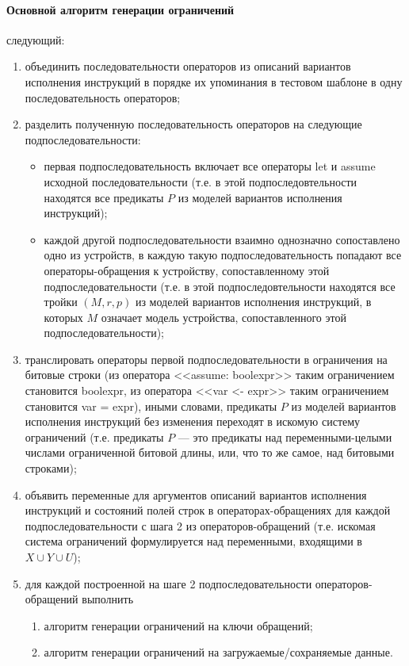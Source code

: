 \paragraph{Основной алгоритм генерации ограничений} следующий:
\begin{enumerate}
    \item объединить последовательности операторов из описаний вариантов исполнения инструкций в порядке их упоминания в тестовом шаблоне в одну последовательность операторов;
    \item разделить полученную последовательность операторов на следующие подпоследовательности:
            \begin{itemize}
                \item первая подпоследовательность включает все операторы let и assume исходной последовательности (т.е. в этой подпоследовтельности находятся все предикаты $P$ из моделей вариантов исполнения инструкций);
                \item каждой другой подпоследовательности взаимно однозначно сопоставлено одно из устройств, в каждую такую подпоследовательность попадают все операторы-обращения к устройству, сопоставленному этой подпоследовательности (т.е. в этой подпоследовтельности находятся все тройки $(M, r, p)$ из моделей вариантов исполнения инструкций, в которых $M$ означает модель устройства, сопоставленного этой подпоследовательности);
            \end{itemize}
    \item транслировать операторы первой подпоследовательности в ограничения на битовые строки (из оператора <<assume: boolexpr>> таким ограничением становится boolexpr, из оператора <<var <- expr>> таким ограничением становится var = expr), иными словами, предикаты $P$ из моделей вариантов исполнения инструкций без изменения переходят в искомую систему ограничений (т.е. предикаты $P$ --- это предикаты над переменными-целыми числами ограниченной битовой длины, или, что то же самое, над битовыми строками);
    \item объявить переменные для аргументов описаний вариантов исполнения инструкций и состояний полей строк в операторах-обращениях для каждой подпоследовательности с шага 2 из операторов-обращений (т.е. искомая система ограничений формулируется над переменными, входящими в $X \cup Y \cup U$);
    \item для каждой построенной на шаге 2 подпоследовательности операторов-обращений выполнить
            \begin{enumerate}
                \item алгоритм генерации ограничений на ключи обращений;
                \item алгоритм генерации ограничений на загружаемые/сохраняемые данные.
            \end{enumerate}
\end{enumerate}

